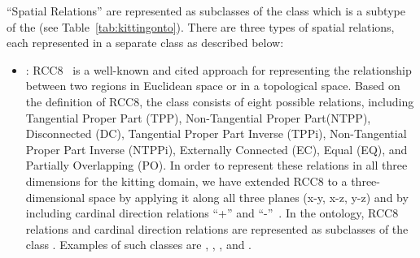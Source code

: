 ``Spatial Relations'' are represented as subclasses of the 
class which is a subtype of the  (see Table~\ref{tab:kittingonto}).
There are three types of spatial relations, each represented in a separate class as described below:
\begin{itemize}
 \item {}: RCC8~\cite{Wolter.KR.2000} is a well-known and cited
approach for representing the relationship between two regions in Euclidean space or
in a topological space. Based on the definition of RCC8, the class 
consists of eight possible relations, including Tangential Proper Part (TPP), Non-Tangential
Proper Part(NTPP), Disconnected (DC), Tangential Proper Part Inverse (TPPi), Non-Tangential
Proper Part Inverse (NTPPi), Externally Connected (EC), Equal (EQ), and Partially
Overlapping (PO). In order to represent these relations in all three dimensions for the
kitting domain, we have extended RCC8 to a three-dimensional space by applying it along
all three planes (x-y, x-z, y-z) and by including cardinal direction relations ``+''
and ``-''~\cite{SCHLENOFF.ECDRM.2012}. In the ontology, RCC8 relations and cardinal direction
relations are represented as subclasses of the class . Examples of
such classes are , , , and .


\end{itemize}
